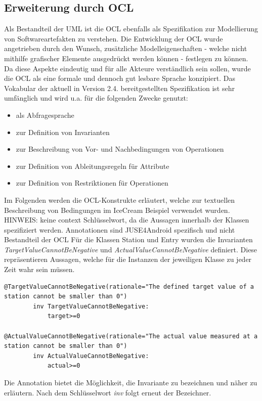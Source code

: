 \documentclass[a4paper,twoside]{article}
\begin{document}
\subsection{Erweiterung durch OCL} 
\label{ssec:ocl}
Als Bestandteil der UML ist die OCL ebenfalls als Spezifikation zur Modellierung von Softwareartefakten zu verstehen. Die Entwicklung der OCL wurde angetrieben durch den Wunsch, zusätzliche Modelleigenschaften - welche nicht mithilfe grafischer Elemente ausgedrückt werden können - festlegen zu können. \cite[S.5ff]{OCLFormal} Da diese Aspekte eindeutig und für alle Akteure verständlich sein sollen, wurde die OCL als eine formale und dennoch gut lesbare Sprache konzipiert. Das Vokabular der aktuell in Version 2.4. bereitgestellten Spezifikation ist sehr umfänglich und wird u.a. für die folgenden Zwecke genutzt: \begin{itemize}
\item als Abfragesprache
\item zur Definition von Invarianten
\item zur Beschreibung von Vor- und Nachbedingungen von Operationen 
\item zur Definition von Ableitungsregeln für Attribute
\item zur Definition von Restriktionen für Operationen
\end{itemize} 
Im Folgenden werden die OCL-Konstrukte erläutert, welche zur textuellen Beschreibung von Bedingungen im IceCream Beispiel verwendet wurden.  HINWEIS: keine context Schlüsselwort, da die Aussagen innerhalb der Klassen spezifiziert werden. Annotationen sind JUSE4Android spezifisch und nicht Bestandteil der OCL
Für die Klassen Station und Entry wurden die Invarianten \textit{TargetValueCannotBeNegative} und \textit{ActualValueCannotBeNegative} definiert. Diese repräsentieren Aussagen, welche für die Instanzen der jeweiligen Klasse zu jeder Zeit wahr sein müssen. \cite[S.188]{OCLFormal}
\begin{lstlisting}
@TargetValueCannotBeNegative(rationale="The defined target value of a station cannot be smaller than 0")
		inv TargetValueCannotBeNegative:
			target>=0
			
@ActualValueCannotBeNegative(rationale="The actual value measured at a station cannot be smaller than 0")
		inv ActualValueCannotBeNegative:
			actual>=0
\end{lstlisting}

Die Annotation bietet die Möglichkeit, die Invariante zu bezeichnen und näher zu erläutern. Nach dem Schlüsselwort \textit{inv} folgt erneut der Bezeichner. 
\end{document}
